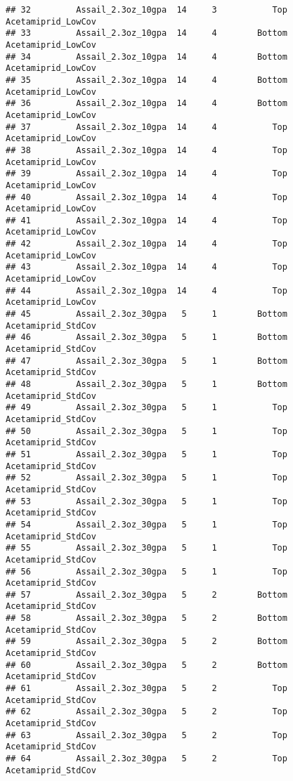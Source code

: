 \documentclass[
]{article}
\begin{document}
\begin{verbatim}
## 32         Assail_2.3oz_10gpa  14     3           Top     Acetamiprid_LowCov
## 33         Assail_2.3oz_10gpa  14     4        Bottom     Acetamiprid_LowCov
## 34         Assail_2.3oz_10gpa  14     4        Bottom     Acetamiprid_LowCov
## 35         Assail_2.3oz_10gpa  14     4        Bottom     Acetamiprid_LowCov
## 36         Assail_2.3oz_10gpa  14     4        Bottom     Acetamiprid_LowCov
## 37         Assail_2.3oz_10gpa  14     4           Top     Acetamiprid_LowCov
## 38         Assail_2.3oz_10gpa  14     4           Top     Acetamiprid_LowCov
## 39         Assail_2.3oz_10gpa  14     4           Top     Acetamiprid_LowCov
## 40         Assail_2.3oz_10gpa  14     4           Top     Acetamiprid_LowCov
## 41         Assail_2.3oz_10gpa  14     4           Top     Acetamiprid_LowCov
## 42         Assail_2.3oz_10gpa  14     4           Top     Acetamiprid_LowCov
## 43         Assail_2.3oz_10gpa  14     4           Top     Acetamiprid_LowCov
## 44         Assail_2.3oz_10gpa  14     4           Top     Acetamiprid_LowCov
## 45         Assail_2.3oz_30gpa   5     1        Bottom     Acetamiprid_StdCov
## 46         Assail_2.3oz_30gpa   5     1        Bottom     Acetamiprid_StdCov
## 47         Assail_2.3oz_30gpa   5     1        Bottom     Acetamiprid_StdCov
## 48         Assail_2.3oz_30gpa   5     1        Bottom     Acetamiprid_StdCov
## 49         Assail_2.3oz_30gpa   5     1           Top     Acetamiprid_StdCov
## 50         Assail_2.3oz_30gpa   5     1           Top     Acetamiprid_StdCov
## 51         Assail_2.3oz_30gpa   5     1           Top     Acetamiprid_StdCov
## 52         Assail_2.3oz_30gpa   5     1           Top     Acetamiprid_StdCov
## 53         Assail_2.3oz_30gpa   5     1           Top     Acetamiprid_StdCov
## 54         Assail_2.3oz_30gpa   5     1           Top     Acetamiprid_StdCov
## 55         Assail_2.3oz_30gpa   5     1           Top     Acetamiprid_StdCov
## 56         Assail_2.3oz_30gpa   5     1           Top     Acetamiprid_StdCov
## 57         Assail_2.3oz_30gpa   5     2        Bottom     Acetamiprid_StdCov
## 58         Assail_2.3oz_30gpa   5     2        Bottom     Acetamiprid_StdCov
## 59         Assail_2.3oz_30gpa   5     2        Bottom     Acetamiprid_StdCov
## 60         Assail_2.3oz_30gpa   5     2        Bottom     Acetamiprid_StdCov
## 61         Assail_2.3oz_30gpa   5     2           Top     Acetamiprid_StdCov
## 62         Assail_2.3oz_30gpa   5     2           Top     Acetamiprid_StdCov
## 63         Assail_2.3oz_30gpa   5     2           Top     Acetamiprid_StdCov
## 64         Assail_2.3oz_30gpa   5     2           Top     Acetamiprid_StdCov

\end{verbatim}
\end{document}
